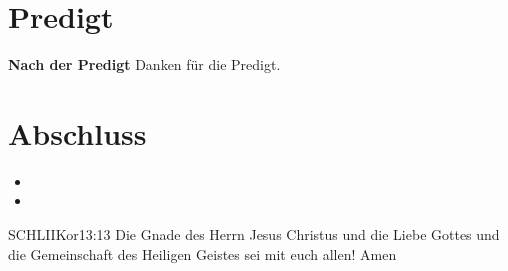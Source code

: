 \documentclass[fontsize=14pt]{mybib}
\begin{document}
\section{Predigt}
\textbf{Nach der Predigt}\newline
Danken für die Predigt.
\section{Abschluss}
\begin{itemize}
    \item [] 
    \item [] \beten{}
\end{itemize}
\begin{bibelbox}{SCHL}{IIKor}{13:13}
    Die Gnade des Herrn Jesus Christus und die Liebe Gottes und die Gemeinschaft des Heiligen Geistes sei mit euch allen! Amen
\end{bibelbox}
\end{document}
